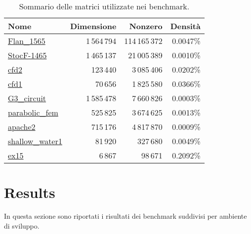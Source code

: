 \documentclass{report}
\begin{document}
            \begin{table}[h]
                \centering
                
                \begin{tabular}{@{}lrrr@{}}
                \toprule
                \textbf{Nome}   
                & \textbf{Dimensione} & \textbf{Nonzero} & \textbf{Densità} \\ 
                \midrule
                \href{https://sparse.tamu.edu/Janna/Flan_1565}{Flan\_1565}      
                & 1\,564\,794    & 114\,165\,372    & 0.0047\%         \\
                \href{https://sparse.tamu.edu/Janna/StocF-1465}{StocF-1465}      
                & 1\,465\,137    & 21\,005\,389     & 0.0010\%         \\
                \href{https://sparse.tamu.edu/Rothberg/cfd2}{cfd2}            
                & 123\,440       & 3\,085\,406      & 0.0202\%         \\
                \href{https://sparse.tamu.edu/Rothberg/cfd1}{cfd1}            
                & 70\,656        & 1\,825\,580      & 0.0366\%         \\
                \href{https://sparse.tamu.edu/AMD/G3_circuit}{G3\_circuit}     
                & 1\,585\,478    & 7\,660\,826      & 0.0003\%         \\
                \href{https://sparse.tamu.edu/Wissgott/parabolic_fem}{parabolic\_fem}  
                & 525\,825       & 3\,674\,625      & 0.0013\%         \\
                \href{https://sparse.tamu.edu/GHS_psdef/apache2}{apache2}         
                & 715\,176       & 4\,817\,870      & 0.0009\%         \\
                \href{https://sparse.tamu.edu/MaxPlanck/shallow_water1}{shallow\_water1} 
                & 81\,920        & 327\,680         & 0.0049\%         \\
                \href{https://sparse.tamu.edu/FIDAP/ex15}{ex15}            
                & 6\,867         & 98\,671          & 0.2092\%         \\ 
                \bottomrule
                \end{tabular}%
                
                \caption{Sommario delle matrici utilizzate nei benchmark.}
                \label{tab:matrices}
                \end{table}
        
        \section{Results}
            In questa sezione sono riportati i risultati dei benchmark suddivisi per ambiente di sviluppo.
\end{document}
